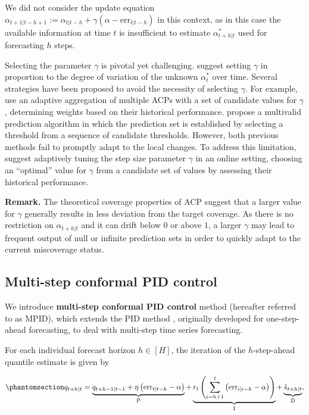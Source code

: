 \documentclass[
  11pt,
  a4paper,
]{article}
\theoremstyle{plain}
\theoremstyle{remark}
\begin{document}
We did not consider the update equation
\(\alpha_{t+1|t-h+1} := \alpha_{t|t-h} + \gamma\left(\alpha - \mathrm{err}_{t|t-h}\right)\)
in this context, as in this case the available information at time \(t\)
is insufficient to estimate \(\alpha_{t+h|t}^{*}\) used for forecasting
\(h\) steps.

Selecting the parameter \(\gamma\) is pivotal yet challenging.
\textcite{gibbs2021} suggest setting \(\gamma\) in proportion to the
degree of variation of the unknown \(\alpha_{t}^{*}\) over time. Several
strategies have been proposed to avoid the necessity of selecting
\(\gamma\). For example, \textcite{zaffran2022} use an adaptive
aggregation of multiple ACPs with a set of candidate values for
\(\gamma\) , determining weights based on their historical performance.
\textcite{bastani2022} propose a multivalid prediction algorithm in
which the prediction set is established by selecting a threshold from a
sequence of candidate thresholds. However, both previous methods fail to
promptly adapt to the local changes. To address this limitation,
\textcite{gibbs2024} suggest adaptively tuning the step size parameter
\(\gamma\) in an online setting, choosing an ``optimal'' value for
\(\gamma\) from a candidate set of values by assessing their historical
performance.

\textbf{Remark.} The theoretical coverage properties of ACP suggest that
a larger value for \(\gamma\) generally results in less deviation from
the target coverage. As there is no restriction on \(\alpha_{t+h|t}\)
and it can drift below \(0\) or above \(1\), a larger \(\gamma\) may
lead to frequent output of null or infinite prediction sets in order to
quickly adapt to the current miscoverage status.

\subsection{Multi-step conformal PID
control}\label{multi-step-conformal-pid-control}

We introduce \textbf{multi-step conformal PID control} method (hereafter
referred to as MPID), which extends the PID method
\autocite{angelopoulos2024}, originally developed for one-step-ahead
forecasting, to deal with multi-step time series forecasting.

For each individual forecast horizon \(h\in[H]\), the iteration of the
\(h\)-step-ahead quantile estimate is given by

\begin{equation}\phantomsection\label{eq-mpid}{
q_{t+h|t}=\underbrace{q_{t+h-1|t-1}+\eta \left(\mathrm{err}_{t|t-h}-\alpha\right)}_{\mathrm{P}}+\underbrace{r_t\left(\sum_{i=h+1}^t \left(\mathrm{err}_{i|i-h}-\alpha\right)\right)}_{\mathrm{I}}+\underbrace{\hat{s}_{t+h|t}}_{\mathrm{D}},
}\end{equation}
\end{document}
